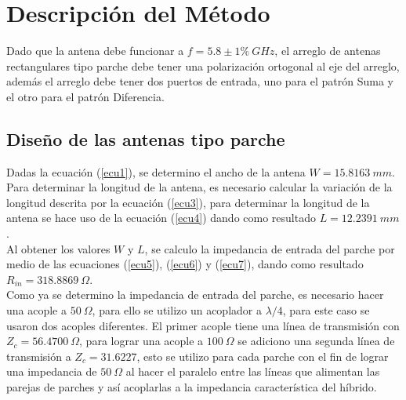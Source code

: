 \documentclass[twocolumn]{IEEEtran}
\begin{document}
\section{Descripción del Método}
\noindent
Dado que la antena debe funcionar a $f=5.8 \pm 1\%\ GHz$, el arreglo de antenas  rectangulares tipo parche debe tener una polarización ortogonal al eje del arreglo, además el arreglo debe tener dos puertos de entrada, uno para el patrón Suma y el otro para el patrón Diferencia.

\subsection{Diseño de las antenas tipo parche}
\noindent
Dadas la ecuación (\ref{ecu1}), se determino el ancho de la antena $W=15.8163\ mm$.\\
Para determinar la longitud de la antena, es necesario calcular la variación de la longitud descrita por la ecuación (\ref{ecu3}), para determinar la longitud de la antena se hace uso de la ecuación (\ref{ecu4}) dando como resultado $L=12.2391\ mm$.\\
Al obtener los valores $W$ y $L$, se calculo la impedancia de entrada del parche por medio de las ecuaciones (\ref{ecu5}), (\ref{ecu6}) y (\ref{ecu7}), dando como resultado $R_{in}=318.8869\ \Omega$.\\
Como ya se determino la impedancia de entrada del parche, es necesario hacer una acople a $50\ \Omega$, para ello se utilizo un acoplador a $\lambda/4$, para este caso se usaron dos acoples diferentes. El primer acople tiene una línea de transmisión con $Z_c=56.4700\ \Omega$, para lograr una acople a $100\ \Omega$ se adiciono una segunda línea de transmisión a $Z_c=31.6227$, esto se utilizo para cada parche con el fin de lograr una impedancia de $50\ \Omega$ al hacer el paralelo entre las líneas que alimentan las parejas de parches y así acoplarlas a la impedancia característica del híbrido.
\end{document}
